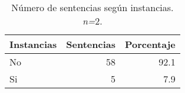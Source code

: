 \begin{table}[H]
\centering
\caption{Número de sentencias según instancias. \textit{n=}2.} 
\label{tab:instancia}
\begin{tabular}{lrr}
  \hline
Instancias & Sentencias & Porcentaje \\ 
  \hline
No & 58 & 92.1 \\ 
  Si &  5 & 7.9 \\ 
   \hline
\end{tabular}
\end{table}
